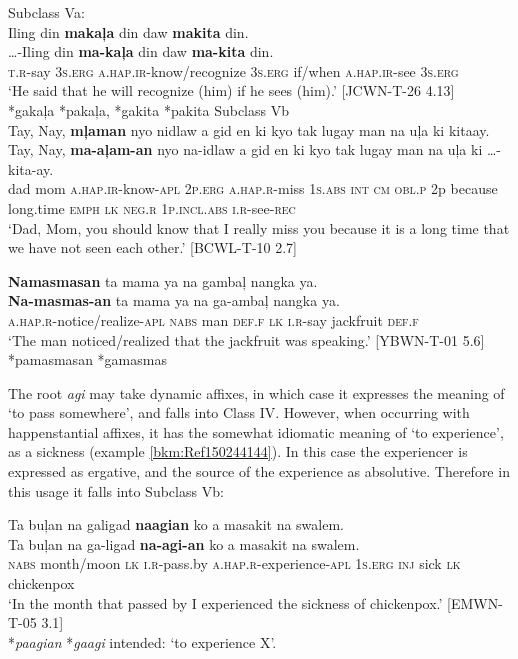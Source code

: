 \ea
Subclass Va: \\
Iling  din  \textbf{makaļa}  din  daw  \textbf{makita}  din. \\\smallskip
\gll …-Iling  din  \textbf{ma-kaļa}  din  daw  \textbf{ma-kita}  din. \\
\textsc{t.r}-say  3\textsc{s.erg}  \textsc{a.hap.ir}-know/recognize  3\textsc{s.erg}  if/when  \textsc{a.hap.ir}-see  3\textsc{s.erg} \\
\glt ‘He said that he will recognize (him) if he sees (him).' [JCWN-T-26 4.13] \\\smallskip
*gakaļa *pakaļa, *gakita *pakita
\z
\ea
Subclass Vb \\
Tay,  Nay,  \textbf{mļaman}  nyo  nidlaw  a  gid  en  ki  kyo tak  lugay  man  na  uļa  ki kitaay. \\\smallskip
\gll Tay,  Nay,  \textbf{ma-aļam-an}  nyo  na-idlaw  a  gid  en  ki  kyo tak  lugay  man  na  uļa  ki  …-kita-ay. \\
dad  mom  \textsc{a.hap.ir}-know-\textsc{apl}  2\textsc{p.erg}  \textsc{a.hap.r}-miss  1\textsc{s.abs}  \textsc{int}  \textsc{cm}  \textsc{obl.p}  2p because  long.time  \textsc{emph}  \textsc{lk}  \textsc{neg.r}  1\textsc{p.incl.abs}  \textsc{i.r}-see-\textsc{rec} \\
\glt ‘Dad, Mom, you should know that I really miss you because it is a long time that we have not seen each other.’ [BCWL-T-10 2.7]
\z

\ea
\textbf{Namasmasan}  ta  mama  ya  na  gambaļ  nangka  ya.\\\smallskip
\gll \textbf{Na-masmas-an}  ta  mama  ya  na  ga-ambaļ  nangka  ya.\\
\textsc{a.hap.r}-notice/realize-\textsc{apl}  \textsc{nabs}  man  \textsc{def.f}  \textsc{lk}  \textsc{i.r}-say  jackfruit  \textsc{def.f}\\
\glt ‘The man noticed/realized that the jackfruit was speaking.’ [YBWN-T-01 5.6] \\\smallskip
  *pamasmasan *gamasmas
\z

The root \textit{agi} may take dynamic affixes, in which case it expresses the meaning of ‘to pass somewhere’, and falls into Class IV. However, when occurring with happenstantial affixes, it has the somewhat idiomatic meaning of ‘to experience’, as a sickness (example \ref{bkm:Ref150244144}). In this case the experiencer is expressed as ergative, and the source of the experience as absolutive. Therefore in this usage it falls into Subclass Vb: 

\ea
\label{bkm:Ref150244144}
Ta  buļan  na  galigad  \textbf{naagian}  ko  a  masakit  na   swalem. \\\smallskip
\gll Ta  buļan  na  ga-ligad  \textbf{na-agi-an}  ko  a  masakit  na   swalem. \\
\textsc{nabs}  month/moon  \textsc{lk}  \textsc{i.r}-pass.by  \textsc{a.hap.r}-experience-\textsc{apl}  1\textsc{s.erg}  \textsc{inj}  sick  \textsc{lk}  chickenpox \\
\glt ‘In the month that passed by I experienced the sickness of chickenpox.’ [EMWN-T-05 3.1] \\\smallskip
*\textit{paagian} *\textit{gaagi} intended: ‘to experience X’.
\z

